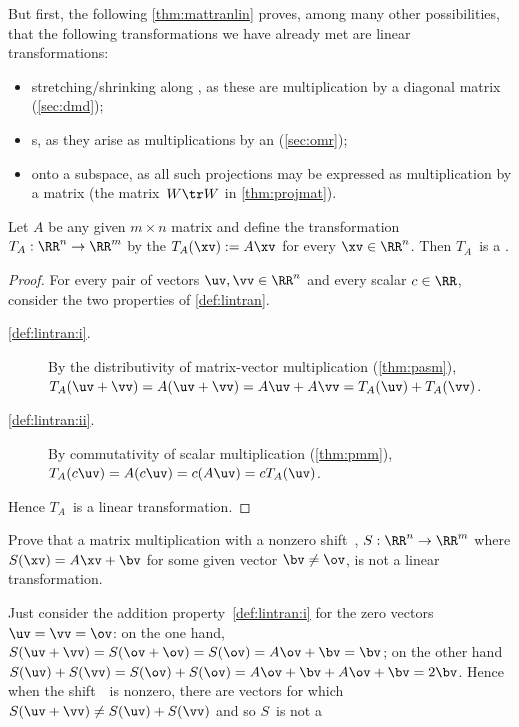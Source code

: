 \begin{example} 
But first, the following \cref{thm:mattranlin} proves, among many other possibilities, that the following transformations we have already met are linear transformations:
\begin{itemize}
\item stretching\slash shrinking along , as these are multiplication by a diagonal matrix (\cref{sec:dmd});
\item {}s, as they arise as multiplications by an  (\cref{sec:omr});
\item {} onto a subspace, as all such projections may be expressed as multiplication by a matrix (the matrix~\(W\tr W\) in \cref{thm:projmat}).
\aqed
\end{itemize}
\end{example}


\begin{theorem} \label{thm:mattranlin} 
Let \(A\) be any given \(m\times n\) matrix and define the transformation \(T_A:\RR^n\to\RR^m\)  by the  \(T_A(\xv):=A\xv\) for every \(\xv\in\RR^n\). 
Then \(T_A\)~is a .
\end{theorem}
\begin{proof} 
For every pair of vectors \(\uv,\vv\in\RR^n\) and every scalar \(c\in\RR\), consider the two properties of \cref{def:lintran}.
\begin{description}
\item[\ref{def:lintran:i}.] By the distributivity of matrix-vector multiplication (\cref{thm:pasm}), \(T_A(\uv+\vv)=A(\uv+\vv)=A\uv+A\vv=T_A(\uv)+T_A(\vv)\).
\item[\ref{def:lintran:ii}.] By commutativity of scalar multiplication (\cref{thm:pmm}), \(T_A(c\uv)=A(c\uv)=c(A\uv)=cT_A(\uv)\).
\end{description}
Hence \(T_A\)~is a linear transformation.
\end{proof}



\begin{example} 
Prove that a matrix multiplication with a nonzero shift~\bv, \(S:\RR^n\to\RR^m\) where \(S(\xv)=A\xv+\bv\) for some given vector \(\bv\neq\ov\), is not a linear transformation.
\begin{solution} 
Just consider the addition property~\ref{def:lintran:i} for the zero vectors \(\uv=\vv=\ov\):  
on the one hand, \(S(\uv+\vv)=S(\ov+\ov)=S(\ov)=A\ov+\bv=\bv\); 
on the other hand \(S(\uv)+S(\vv)=S(\ov)+S(\ov)=A\ov+\bv+A\ov+\bv=2\bv\).  
Hence when the shift~\bv\ is nonzero, there are vectors for which \(S(\uv+\vv)\neq S(\uv)+S(\vv)\) and so \(S\)~is not a 
\end{solution}
\end{example}




